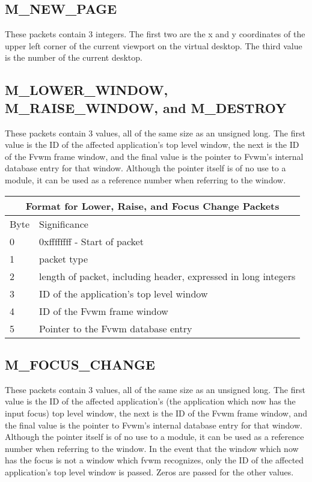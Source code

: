 \subsection{M\_NEW\_PAGE}
These packets contain 3 integers. The first two are the x and y
coordinates of the upper left corner of the current viewport on the
virtual desktop. The third value is the number of the current desktop.

\subsection{M\_LOWER\_WINDOW, M\_RAISE\_WINDOW, and M\_DESTROY}
These packets contain 3 values, all of the same size as an unsigned
long. The first value is the ID of the affected application's top level
window, the next is the ID of the Fvwm frame window, and the final
value is the pointer to Fvwm's internal database entry for that
window. Although the pointer itself is of no use to a module, it can
be used as a reference number when referring to the window.

\begin{table}
\begin{center}
\begin{tabular}[h]{|l|l|} \hline
\multicolumn{2}{|c|}{Format for Lower, Raise, and Focus Change Packets} \\ \hline
Byte &Significance \\\hline
0    & 0xffffffff - Start of packet \\
1    & packet type \\
2    & length of packet, including header, expressed in long integers
\\ \hline
3    & ID of the application's top level window \\
4    & ID of the Fvwm frame window \\
5    & Pointer to the Fvwm database entry \\ \hline
\end{tabular}
\end{center}
\end{table}


\subsection{M\_FOCUS\_CHANGE}
These packets contain 3 values, all of the same size as an unsigned
long. The first value is the ID of the affected application's (the
application which now has the input focus) top level
window, the next is the ID of the Fvwm frame window, and the final
value is the pointer to Fvwm's internal database entry for that
window. Although the pointer itself is of no use to a module, it can
be used as a reference number when referring to the window. In the
event that the window which now has the focus is not a window which
fvwm recognizes, only the ID of the affected application's top level
window is passed. Zeros are passed for the other values.

